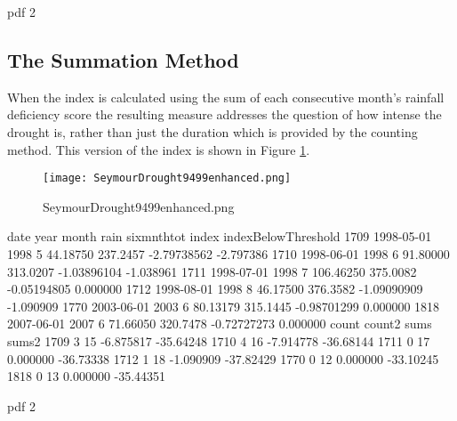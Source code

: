 \documentclass[a4paper]{article}                %
\begin{document}



\begin{Schunk}
\begin{Soutput}
pdf 
  2 
\end{Soutput}
\end{Schunk}

        \subsection{The Summation Method}
        When the index is calculated using the sum of each consecutive month's rainfall deficiency score the resulting measure addresses  the question of how intense the drought is, rather than just the duration which is provided by the counting method.  This version  of the index is shown in Figure \ref{fig:SeymourDrought9499enhanced.png}.


        \begin{figure}[!h]
        \centering
        \texttt{[image: SeymourDrought9499enhanced.png]}
        \caption{SeymourDrought9499enhanced.png}
        \label{fig:SeymourDrought9499enhanced.png}
        \end{figure}


\begin{Schunk}
\begin{Soutput}
           date year month      rain sixmnthtot       index indexBelowThreshold
1709 1998-05-01 1998     5  44.18750   237.2457 -2.79738562           -2.797386
1710 1998-06-01 1998     6  91.80000   313.0207 -1.03896104           -1.038961
1711 1998-07-01 1998     7 106.46250   375.0082 -0.05194805            0.000000
1712 1998-08-01 1998     8  46.17500   376.3582 -1.09090909           -1.090909
1770 2003-06-01 2003     6  80.13179   315.1445 -0.98701299            0.000000
1818 2007-06-01 2007     6  71.66050   320.7478 -0.72727273            0.000000
     count count2      sums     sums2
1709     3     15 -6.875817 -35.64248
1710     4     16 -7.914778 -36.68144
1711     0     17  0.000000 -36.73338
1712     1     18 -1.090909 -37.82429
1770     0     12  0.000000 -33.10245
1818     0     13  0.000000 -35.44351
\end{Soutput}
\begin{Soutput}
pdf 
  2 
\end{Soutput}
\end{Schunk}
\end{document}
